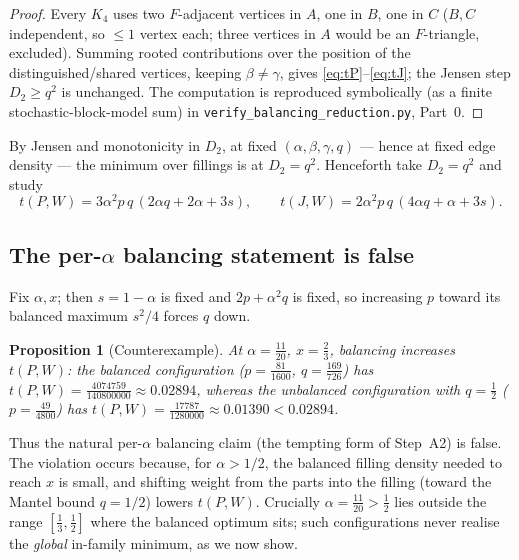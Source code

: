 \documentclass[11pt]{amsart}
\newtheorem{proposition}[theorem]{Proposition}
\theoremstyle{definition}
\newcommand{\1}{\mathbf 1}
\begin{document}
\begin{proof}
Every $K_4$ uses two $F$-adjacent vertices in $A$, one in $B$, one in $C$ ($B,C$
independent, so $\le1$ vertex each; three vertices in $A$ would be an
$F$-triangle, excluded).  Summing rooted contributions over the position of the
distinguished/shared vertices, keeping $\beta\ne\gamma$, gives
\eqref{eq:tP}--\eqref{eq:tJ}; the Jensen step $D_2\ge q^2$ is unchanged.  The
computation is reproduced symbolically (as a finite stochastic-block-model sum)
in \texttt{verify\_balancing\_reduction.py}, Part~0.
\end{proof}

By Jensen and monotonicity in $D_2$, at fixed $(\alpha,\beta,\gamma,q)$ --- hence
at fixed edge density --- the minimum over fillings is at $D_2=q^2$.  Henceforth
take $D_2=q^2$ and study
\begin{equation}
\label{eq:Treg}
   t(P,W)=3\alpha^2 p\,q\,(2\alpha q+2\alpha+3s),\qquad
   t(J,W)=2\alpha^2 p\,q\,(4\alpha q+\alpha+3s).
\end{equation}

\subsection{The per-$\alpha$ balancing statement is false}

Fix $\alpha,x$; then $s=1-\alpha$ is fixed and $2p+\alpha^2 q$ is fixed, so
increasing $p$ toward its balanced maximum $s^2/4$ forces $q$ down.

\begin{proposition}[Counterexample]
\label{prop:counter}
At $\alpha=\tfrac{11}{20}$, $x=\tfrac23$, balancing \emph{increases} $t(P,W)$:
the balanced configuration ($p=\tfrac{81}{1600}$, $q=\tfrac{169}{726}$) has
$t(P,W)=\tfrac{4074759}{140800000}\approx0.02894$, whereas the unbalanced
configuration with $q=\tfrac12$ ($p=\tfrac{49}{4800}$) has
$t(P,W)=\tfrac{17787}{1280000}\approx0.01390<0.02894$.
\end{proposition}

Thus the natural per-$\alpha$ balancing claim (the tempting form of Step~A2) is
false.  The violation occurs because, for $\alpha>1/2$, the balanced filling
density needed to reach $x$ is small, and shifting weight from the parts into the
filling (toward the Mantel bound $q=1/2$) lowers $t(P,W)$.  Crucially
$\alpha=\tfrac{11}{20}>\tfrac12$ lies outside the range $[\tfrac13,\tfrac12]$
where the balanced optimum sits; such configurations never realise the
\emph{global} in-family minimum, as we now show.
\end{document}
